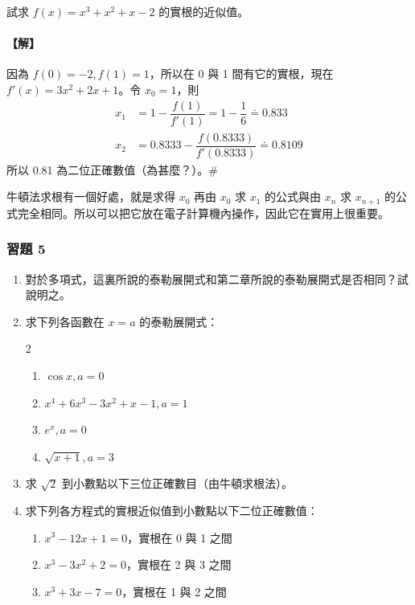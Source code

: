 \begin{example}\label{ex:b6s-app4-25}
試求 $f(x)=x^3+x^2+x-2$ 的實根的近似值。
\end{example}

\paragraph{【解】}
因為 $f(0)=-2, f(1)=1$，所以在 0 與 1 間有它的實根，現在 $f'(x)=3x^2+2x+1$。令 $x_0=1$，則
\begin{align*}
x_1 &= 1 - \dfrac{f(1)}{f'(1)} = 1 - \dfrac{1}{6} \doteq 0.833 \\
x_2 &= 0.8333 - \dfrac{f(0.8333)}{f'(0.8333)} \doteq 0.8109
\end{align*}
所以 0.81 為二位正確數值（為甚麼？）。\hfill$\#$

牛頓法求根有一個好處，就是求得 $x_0$ 再由 $x_0$ 求 $x_1$ 的公式與由 $x_n$ 求 $x_{n+1}$ 的公式完全相同。所以可以把它放在電子計算機內操作，因此它在實用上很重要。

\subsubsection*{習題 5}\label{sec:b6s-ex-app4-5}

\begin{enumerate}[label=\arabic*., leftmargin=2em]
  \item 對於多項式，這裏所說的泰勒展開式和第二章所說的泰勒展開式是否相同？試說明之。
  \item 求下列各函數在 $x=a$ 的泰勒展開式：
  \begin{multicols}{2}
  \begin{enumerate}[label=\roman*)]
    \item $\cos x, a=0$
    \item $x^4+6x^3-3x^2+x-1, a=1$
    \item $e^x, a=0$
    \item $\sqrt{x+1}, a=3$
  \end{enumerate}
  \end{multicols}
  \item 求 $\sqrt{2}$ 到小數點以下三位正確數目（由牛頓求根法）。
  \item 求下列各方程式的實根近似值到小數點以下二位正確數值：
  \begin{enumerate}[label=\roman*)]
    \item $x^3-12x+1=0$，實根在 0 與 1 之間
    \item $x^3-3x^2+2=0$，實根在 2 與 3 之間
    \item $x^3+3x-7=0$，實根在 1 與 2 之間
  \end{enumerate}
\end{enumerate}

